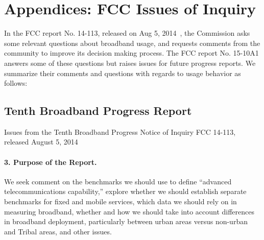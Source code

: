 \section*{Appendices: FCC Issues of Inquiry}
\label{sec:appendix}

In the FCC report No. 14-113, released on Aug 5, 2014~\cite{fcc2014progress-report},
the Commission asks some relevant questions about broadband usage, and requests comments
from the community to improve its decision making process. The FCC report No. 15-10A1
answers some of these questions but raises issues for future progress reports.
We summarize their comments and questions with regards to usage behavior
as follows:


\renewcommand{\thesubsection}{\Alph{subsection}}

\subsection{Tenth Broadband Progress Report}
\label{subsec:fcc2014}

Issues from the Tenth Broadband Progress Notice of Inquiry FCC 14-113, released 
August 5, 2014~\cite{fcc2014progress-report}

\paragraph{3. Purpose of the Report. } We seek comment on the benchmarks we should use 
to define ``advanced telecommunications capability,'' explore whether we should establish 
separate benchmarks for fixed and mobile services, which data we should rely on in 
measuring broadband, whether and how we should take into account differences in 
broadband deployment, particularly between urban areas versus non-urban and Tribal 
areas, and other issues.

